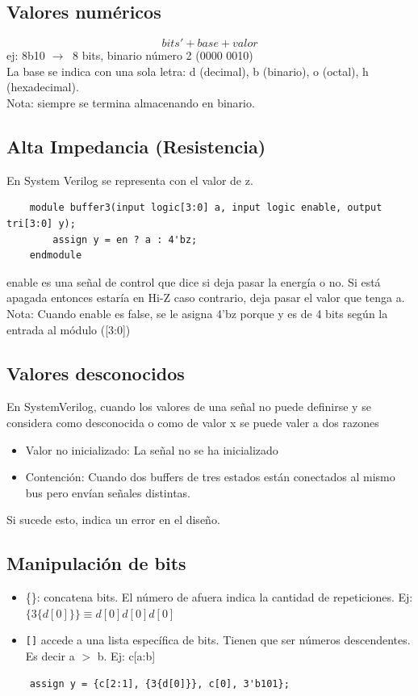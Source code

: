 \documentclass[10pt,a4paper]{article}
\begin{document}
\subsection*{Valores numéricos}
\[bits' + base + valor\]
ej: 8b10 $ \rightarrow \ $ 8 bits, binario número 2 (0000 0010) \\ 
La base se indica con una sola letra: d (decimal), b (binario), o (octal), h (hexadecimal). \\
Nota: siempre se termina almacenando en binario. 
\subsection*{Alta Impedancia (Resistencia)}
En System Verilog se representa con el valor de z. \\
\begin{lstlisting}
    module buffer3(input logic[3:0] a, input logic enable, output tri[3:0] y);
        assign y = en ? a : 4'bz;
    endmodule
\end{lstlisting}
enable es una señal de control que dice si deja pasar la energía o no. Si está apagada entonces estaría en Hi-Z caso contrario, deja pasar el valor que tenga a. \\ 
Nota: Cuando enable es false, se le asigna 4'bz porque y es de 4 bits según la entrada al módulo ([3:0])
\subsection*{Valores desconocidos}
En SystemVerilog, cuando los valores de una señal no puede definirse y se considera como desconocida o como de valor x se puede valer a dos razones 
\begin{itemize}
    \item Valor no inicializado: La señal no se ha inicializado
    \item Contención: Cuando dos buffers de tres estados están conectados al mismo bus pero envían señales distintas.
\end{itemize}
Si sucede esto, indica un error en el diseño. 
\subsection*{Manipulación de bits}
\begin{itemize}
    \item \{\}: concatena bits. El número de afuera indica la cantidad de repeticiones. Ej: $ \{3\{d[0]\}\} \equiv d[0]d[0]d[0] $  
    \item \texttt{[]} accede a una lista específica de bits. Tienen que ser números descendentes. Es decir a $>$ b. Ej: c[a:b]
\end{itemize}
\begin{lstlisting}
    assign y = {c[2:1], {3{d[0]}}, c[0], 3'b101};
\end{lstlisting}
\end{document}

